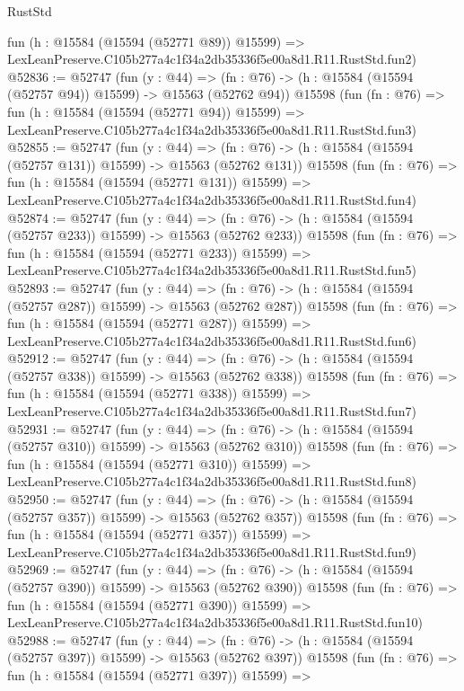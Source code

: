 \begin{lexlean}{RustStd}
\begin{coremodule}
    fun (h : @15584 (@15594 (@52771 @89)) @15599) =>
    LexLeanPreserve.C105b277a4c1f34a2db35336f5e00a8d1.R11.RustStd.fun2)
@52836 := @52747
    (fun (y : @44) =>
    (fn : @76) -> (h : @15584 (@15594 (@52757 @94)) @15599) -> @15563 (@52762 @94))
    @15598
    (fun (fn : @76) =>
    fun (h : @15584 (@15594 (@52771 @94)) @15599) =>
    LexLeanPreserve.C105b277a4c1f34a2db35336f5e00a8d1.R11.RustStd.fun3)
@52855 := @52747
    (fun (y : @44) =>
    (fn : @76) -> (h : @15584 (@15594 (@52757 @131)) @15599) -> @15563 (@52762 @131))
    @15598
    (fun (fn : @76) =>
    fun (h : @15584 (@15594 (@52771 @131)) @15599) =>
    LexLeanPreserve.C105b277a4c1f34a2db35336f5e00a8d1.R11.RustStd.fun4)
@52874 := @52747
    (fun (y : @44) =>
    (fn : @76) -> (h : @15584 (@15594 (@52757 @233)) @15599) -> @15563 (@52762 @233))
    @15598
    (fun (fn : @76) =>
    fun (h : @15584 (@15594 (@52771 @233)) @15599) =>
    LexLeanPreserve.C105b277a4c1f34a2db35336f5e00a8d1.R11.RustStd.fun5)
@52893 := @52747
    (fun (y : @44) =>
    (fn : @76) -> (h : @15584 (@15594 (@52757 @287)) @15599) -> @15563 (@52762 @287))
    @15598
    (fun (fn : @76) =>
    fun (h : @15584 (@15594 (@52771 @287)) @15599) =>
    LexLeanPreserve.C105b277a4c1f34a2db35336f5e00a8d1.R11.RustStd.fun6)
@52912 := @52747
    (fun (y : @44) =>
    (fn : @76) -> (h : @15584 (@15594 (@52757 @338)) @15599) -> @15563 (@52762 @338))
    @15598
    (fun (fn : @76) =>
    fun (h : @15584 (@15594 (@52771 @338)) @15599) =>
    LexLeanPreserve.C105b277a4c1f34a2db35336f5e00a8d1.R11.RustStd.fun7)
@52931 := @52747
    (fun (y : @44) =>
    (fn : @76) -> (h : @15584 (@15594 (@52757 @310)) @15599) -> @15563 (@52762 @310))
    @15598
    (fun (fn : @76) =>
    fun (h : @15584 (@15594 (@52771 @310)) @15599) =>
    LexLeanPreserve.C105b277a4c1f34a2db35336f5e00a8d1.R11.RustStd.fun8)
@52950 := @52747
    (fun (y : @44) =>
    (fn : @76) -> (h : @15584 (@15594 (@52757 @357)) @15599) -> @15563 (@52762 @357))
    @15598
    (fun (fn : @76) =>
    fun (h : @15584 (@15594 (@52771 @357)) @15599) =>
    LexLeanPreserve.C105b277a4c1f34a2db35336f5e00a8d1.R11.RustStd.fun9)
@52969 := @52747
    (fun (y : @44) =>
    (fn : @76) -> (h : @15584 (@15594 (@52757 @390)) @15599) -> @15563 (@52762 @390))
    @15598
    (fun (fn : @76) =>
    fun (h : @15584 (@15594 (@52771 @390)) @15599) =>
    LexLeanPreserve.C105b277a4c1f34a2db35336f5e00a8d1.R11.RustStd.fun10)
@52988 := @52747
    (fun (y : @44) =>
    (fn : @76) -> (h : @15584 (@15594 (@52757 @397)) @15599) -> @15563 (@52762 @397))
    @15598
    (fun (fn : @76) =>
    fun (h : @15584 (@15594 (@52771 @397)) @15599) =>

\end{coremodule}
\end{lexlean}
